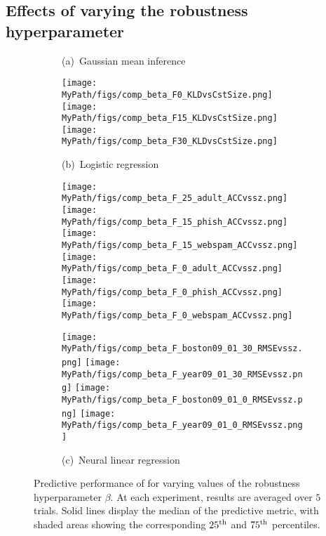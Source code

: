\subsection{Effects of varying the robustness hyperparameter}
\label{sec:sensitivity}

\begin{figure}[!tp]
	\begin{subfigure}[]{0.995\textwidth} 
		\centering
		\caption{(a)~Gaussian mean inference~\label{fig:betas_gaussian}}
		\centering
		\texttt{[image: \\MyPath/figs/comp\_beta\_F0\_KLDvsCstSize.png]}
		\centering
		\hfill
		\texttt{[image: \\MyPath/figs/comp\_beta\_F15\_KLDvsCstSize.png]}
		\centering
		\hfill
		\texttt{[image: \\MyPath/figs/comp\_beta\_F30\_KLDvsCstSize.png]}
		\centering
		\caption{(b)~Logistic regression~\label{fig:betas_logreg}}
		\centering 
		\hfill
		\texttt{[image: \\MyPath/figs/comp\_beta\_F\_25\_adult\_ACCvssz.png]}
		\centering
		\hfil
		\texttt{[image: \\MyPath/figs/comp\_beta\_F\_15\_phish\_ACCvssz.png]}
		\centering
		\hfill
		\texttt{[image: \\MyPath/figs/comp\_beta\_F\_15\_webspam\_ACCvssz.png]}
		\centering
		\texttt{[image: \\MyPath/figs/comp\_beta\_F\_0\_adult\_ACCvssz.png]}
		\centering
		\hfill
		\texttt{[image: \\MyPath/figs/comp\_beta\_F\_0\_phish\_ACCvssz.png]}
		\centering
		\hfill
		\texttt{[image: \\MyPath/figs/comp\_beta\_F\_0\_webspam\_ACCvssz.png]}
		\centering
		\caption{(c)~Neural linear regression~\label{fig:betas_neurlinreg}}
		\centering
		\texttt{[image: \\MyPath/figs/comp\_beta\_F\_boston09\_01\_30\_RMSEvssz.png]}
		\centering
		\texttt{[image: \\MyPath/figs/comp\_beta\_F\_year09\_01\_30\_RMSEvssz.png]}
		\centering
		\texttt{[image: \\MyPath/figs/comp\_beta\_F\_boston09\_01\_0\_RMSEvssz.png]}
		\centering
		\texttt{[image: \\MyPath/figs/comp\_beta\_F\_year09\_01\_0\_RMSEvssz.png]}
	\end{subfigure}	
	\centering
	\caption{Predictive performance of \bcores{} for varying values of the robustness hyperparameter $\beta$. At each experiment, results are averaged over $5$ trials. Solid lines display the median of the predictive metric, with shaded areas showing the corresponding $25\textsuperscript{th}$ and $75\textsuperscript{th}$ percentiles.}
	\label{fig:beta_sens}
\end{figure}

